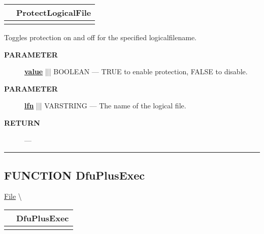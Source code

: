 {\renewcommand{\arraystretch}{1.5}
\begin{tabularx}{\textwidth}{|>{\raggedright\arraybackslash}l|X|}
\hline
\hspace{0pt}\mytexttt{\color{red} } & \textbf{ProtectLogicalFile} \\
\hline
\multicolumn{2}{|>{\raggedright\arraybackslash}X|}{\hspace{0pt}\mytexttt{\color{param} (varstring lfn, boolean value=TRUE)}} \\
\hline
\end{tabularx}
}

\par





Toggles protection on and off for the specified logicalfilename.






\par
\begin{description}
\item [\colorbox{tagtype}{\color{white} \textbf{\textsf{PARAMETER}}}] \textbf{\underline{value}} ||| BOOLEAN --- TRUE to enable protection, FALSE to disable.
\item [\colorbox{tagtype}{\color{white} \textbf{\textsf{PARAMETER}}}] \textbf{\underline{lfn}} ||| VARSTRING --- The name of the logical file.
\end{description}







\par
\begin{description}
\item [\colorbox{tagtype}{\color{white} \textbf{\textsf{RETURN}}}] \textbf{} --- 
\end{description}




\rule{\linewidth}{0.5pt}
\subsection*{\textsf{\colorbox{headtoc}{\color{white} FUNCTION}
DfuPlusExec}}

\hypertarget{ecldoc:file.dfuplusexec}{}
\hspace{0pt} \hyperlink{ecldoc:File}{File} \textbackslash 

{\renewcommand{\arraystretch}{1.5}
\begin{tabularx}{\textwidth}{|>{\raggedright\arraybackslash}l|X|}
\hline
\hspace{0pt}\mytexttt{\color{red} } & \textbf{DfuPlusExec} \\
\hline
\multicolumn{2}{|>{\raggedright\arraybackslash}X|}{\hspace{0pt}\mytexttt{\color{param} (varstring cmdline)}} \\
\hline
\end{tabularx}
}

